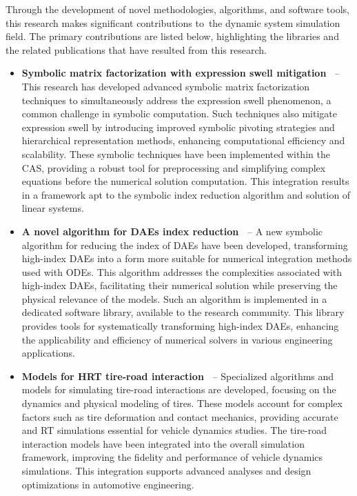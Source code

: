 Through the development of novel methodologies, algorithms, and software tools, this research makes significant contributions to the dynamic system simulation field. The primary contributions are listed below, highlighting the libraries and the related publications that have resulted from this research.
%
\begin{itemize}
  \setlength\itemsep{0em}
  \item \textbf{Symbolic matrix factorization with expression swell mitigation~\cite{lem, last}} -- This research has developed advanced symbolic matrix factorization techniques to simultaneously address the expression swell phenomenon, a common challenge in symbolic computation. Such techniques also mitigate expression swell by introducing improved symbolic pivoting strategies and hierarchical representation methods, enhancing computational efficiency and scalability. These symbolic techniques have been implemented within the \Maple{} \ac{CAS}, providing a robust tool for preprocessing and simplifying complex equations before the numerical solution computation. This integration results in a framework apt to the symbolic index reduction algorithm and solution of linear systems.
  \item \textbf{A novel algorithm for \acp{DAE} index reduction~\cite{indigo,stocco2024symbolic, stocco2024matrix}} -- A new symbolic algorithm for reducing the index of \acp{DAE} have been developed, transforming high-index \acp{DAE} into a form more suitable for numerical integration methods used with \acp{ODE}. This algorithm addresses the complexities associated with high-index \acp{DAE}, facilitating their numerical solution while preserving the physical relevance of the models. Such an algorithm is implemented in a dedicated software library, available to the research community. This library provides tools for systematically transforming high-index \acp{DAE}, enhancing the applicability and efficiency of numerical solvers in various engineering applications.
  \item \textbf{Models for \ac{HRT} tire-road interaction~\cite{acme, enve, stocco2021acme, stocco2024novel}} -- Specialized algorithms and models for simulating tire-road interactions are developed, focusing on the dynamics and physical modeling of tires. These models account for complex factors such as tire deformation and contact mechanics, providing accurate and \ac{RT} simulations essential for vehicle dynamics studies. The tire-road interaction models have been integrated into the overall simulation framework, improving the fidelity and performance of vehicle dynamics simulations. This integration supports advanced analyses and design optimizations in automotive engineering.

\end{itemize}
